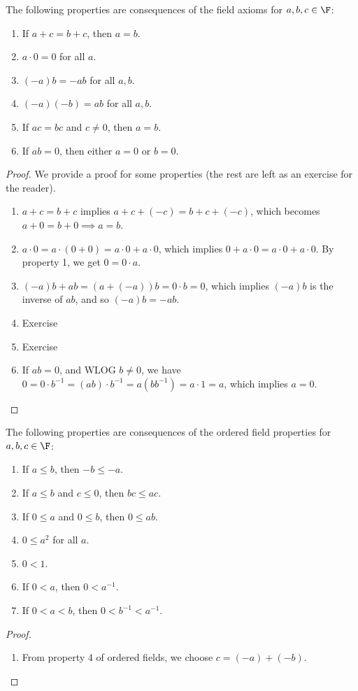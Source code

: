 \documentclass[math1010-lecture-notes]{subfiles}
\begin{document}
\begin{theorem}{}
  The following properties are consequences of the field axioms for  $a,b,c\in \F$:
  \begin{enumerate}
    \item If $a+c=b+c$, then  $a=b$.
    \item  $a\cdot 0=0$ for all $a$.
    \item  $(-a)b=-ab$ for all  $a,b$.
    \item  $(-a)(-b)=ab$ for all  $a,b$.
    \item  If $ac=bc$ and  $c\neq 0$, then $a=b$.
    \item  If $ab=0$, then either  $a=0$ or  $b=0$.
  \end{enumerate}
\end{theorem}
\begin{proof}[Proof]
  We provide a proof for some properties (the rest are left as an exercise for the reader).
  \begin{enumerate}
    \item $a+c=b+c$ implies  $a+c+(-c)=b+c+(-c)$, which becomes $a+0=b+0 \implies a=b$.
    \item $a\cdot 0=a\cdot (0+0)=a\cdot 0+a\cdot 0$, which implies $0+a\cdot 0=a\cdot 0+a\cdot 0$.
      By property 1, we get $0=0\cdot a$.
    \item $(-a)b + ab = (a+(-a))b = 0\cdot b = 0$, which implies $(-a)b$ is the inverse of  $ab$,
      and so  $(-a)b=-ab$. 
    \item Exercise
    \item Exercise
    \item If $ab=0$, and WLOG $b\neq 0$, we have $0=0\cdot b^{-1}=(ab)\cdot b^{-1}=a(bb^{-1})=a\cdot
      1=a$, which implies $a=0$.
  \end{enumerate}
\end{proof}

\begin{theorem}{}
  The following properties are consequences of the ordered field properties for $a,b,c\in \F$:
  \begin{enumerate}
    \item If $a\le b$, then $-b\le -a$.
    \item If $a\le b$ and $c\le 0$, then $bc\le ac$.
    \item If $0\le a$ and $0\le b$, then $0\le ab$.
    \item $0\le a^2$ for all $a$.
    \item $0<1$.
    \item If $0<a$, then  $0<a^{-1}$.
    \item If $0<a<b$, then $0<b^{-1}<a^{-1}$.
  \end{enumerate}
\end{theorem}
\begin{proof}[Proof]
  \begin{enumerate}
    \item From property 4 of ordered fields, we choose $c=(-a) + (-b)$.
  \end{enumerate}
\end{proof}
\end{document}
